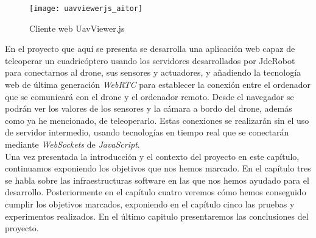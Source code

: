 \begin{figure}[h!]
\centering
\texttt{[image: uavviewerjs\_aitor]}
\caption{Cliente web UavViewer.js}
\label{fig:introrobuavjs}
\end{figure}


En el proyecto que aquí se presenta se desarrolla una aplicación web capaz de teleoperar un cuadricóptero usando los servidores desarrollados por JdeRobot para conectarnos al drone, sus sensores y actuadores, y añadiendo la tecnología web de última generación \emph{WebRTC} para establecer la conexión entre el ordenador que se comunicará con el drone y el ordenador remoto. Desde el navegador se podrán ver los valores de los sensores y la cámara a bordo del drone, además como ya he mencionado, de teleoperarlo. Estas conexiones se realizarán sin el uso de servidor intermedio, usando tecnologías en tiempo real que se conectarán mediante \emph{WebSockets} de \emph{JavaScript}.\\


Una vez presentada la introducción y el contexto del proyecto en este capítulo, continuamos exponiendo los objetivos que nos hemos marcado. En el capítulo tres se habla sobre las infraestructuras software en las que nos hemos ayudado para el desarrollo. Posteriormente en el capítulo cuatro veremos cómo hemos conseguido cumplir los objetivos marcados, exponiendo en el capítulo cinco las pruebas y experimentos realizados. En el último capitulo presentaremos las conclusiones del proyecto.\\
